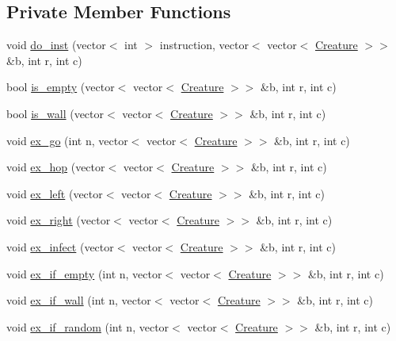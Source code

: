 \subsection*{Private Member Functions}
\begin{DoxyCompactItemize}
\item 
void \hyperlink{classCreature_a0ba8309e2bb177bee778bc04c5ae6600}{do\-\_\-inst} (vector$<$ int $>$ instruction, vector$<$ vector$<$ \hyperlink{classCreature}{Creature} $>$$>$ \&b, int r, int c)
\item 
bool \hyperlink{classCreature_a118264a151dab550ac41311f9f8f7ea7}{is\-\_\-empty} (vector$<$ vector$<$ \hyperlink{classCreature}{Creature} $>$$>$ \&b, int r, int c)
\item 
bool \hyperlink{classCreature_a2ee600c55740e9a673b6233e7c786fd0}{is\-\_\-wall} (vector$<$ vector$<$ \hyperlink{classCreature}{Creature} $>$$>$ \&b, int r, int c)
\item 
void \hyperlink{classCreature_ab092a23505a251dde52dcbd0a5d83ee0}{ex\-\_\-go} (int n, vector$<$ vector$<$ \hyperlink{classCreature}{Creature} $>$$>$ \&b, int r, int c)
\item 
void \hyperlink{classCreature_a5411825ca5c36b299b3ca4e4222dbb9b}{ex\-\_\-hop} (vector$<$ vector$<$ \hyperlink{classCreature}{Creature} $>$$>$ \&b, int r, int c)
\item 
void \hyperlink{classCreature_ad6f4463f69ef701c0798a7802f4e6973}{ex\-\_\-left} (vector$<$ vector$<$ \hyperlink{classCreature}{Creature} $>$$>$ \&b, int r, int c)
\item 
void \hyperlink{classCreature_ae721bf8dc33713a72cbf3d663cb59af9}{ex\-\_\-right} (vector$<$ vector$<$ \hyperlink{classCreature}{Creature} $>$$>$ \&b, int r, int c)
\item 
void \hyperlink{classCreature_aece9588116d8893fd52389b6f7983e23}{ex\-\_\-infect} (vector$<$ vector$<$ \hyperlink{classCreature}{Creature} $>$$>$ \&b, int r, int c)
\item 
void \hyperlink{classCreature_a505eea4d6df8258266c4ef98c5f2fa3e}{ex\-\_\-if\-\_\-empty} (int n, vector$<$ vector$<$ \hyperlink{classCreature}{Creature} $>$$>$ \&b, int r, int c)
\item 
void \hyperlink{classCreature_a27ab40b5dc735d84122c57770b87e5c6}{ex\-\_\-if\-\_\-wall} (int n, vector$<$ vector$<$ \hyperlink{classCreature}{Creature} $>$$>$ \&b, int r, int c)
\item 
void \hyperlink{classCreature_a437d507bf4079391cbcfed4d8e547fe5}{ex\-\_\-if\-\_\-random} (int n, vector$<$ vector$<$ \hyperlink{classCreature}{Creature} $>$$>$ \&b, int r, int c)
$$
\end{DoxyCompactItemize}
